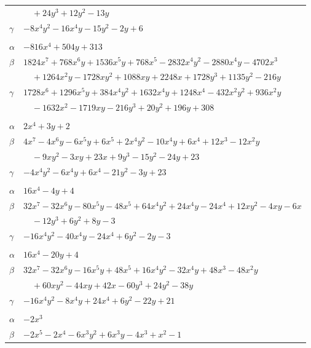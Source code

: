 \documentclass[11pt]{article}
\begin{document}
\begin{longtable}{@{}ll@{}}
 & $\quad +24y^{3}+12y^{2}-13y$\\
$\gamma$ & $-8x^{4}y^{2}-16x^{4}y-15y^{2}-2y+6$\\
\addlinespace[3pt]
\multicolumn{2}{@{}l}{$\{i,j\}=\{1,9\}$, $k_{ij}=5$}\\
$\alpha$ & $-816x^{4}+504y+313$\\
$\beta$ & $1824x^{7}+768x^{6}y+1536x^{5}y+768x^{5}-2832x^{4}y^{2}-2880x^{4}y-4702x^{3}$\\
 & $\quad +1264x^{2}y-1728xy^{2}+1088xy+2248x+1728y^{3}+1135y^{2}-216y$\\
$\gamma$ & $1728x^{6}+1296x^{5}y+384x^{4}y^{2}+1632x^{4}y+1248x^{4}-432x^{2}y^{2}+936x^{2}y$\\
 & $\quad -1632x^{2}-1719xy-216y^{3}+20y^{2}+196y+308$\\
\addlinespace[3pt]
\multicolumn{2}{@{}l}{$\{i,j\}=\{1,10\}$, $k_{ij}=5^{2}$}\\
$\alpha$ & $2x^{4}+3y+2$\\
$\beta$ & $4x^{7}-4x^{6}y-6x^{5}y+6x^{5}+2x^{4}y^{2}-10x^{4}y+6x^{4}+12x^{3}-12x^{2}y$\\
 & $\quad -9xy^{2}-3xy+23x+9y^{3}-15y^{2}-24y+23$\\
$\gamma$ & $-4x^{4}y^{2}-6x^{4}y+6x^{4}-21y^{2}-3y+23$\\
\addlinespace[3pt]
\multicolumn{2}{@{}l}{$\{i,j\}=\{1,11\}$, $k_{ij}=1$}\\
$\alpha$ & $16x^{4}-4y+4$\\
$\beta$ & $32x^{7}-32x^{6}y-80x^{5}y-48x^{5}+64x^{4}y^{2}+24x^{4}y-24x^{4}+12xy^{2}-4xy-6x$\\
 & $\quad -12y^{3}+6y^{2}+8y-3$\\
$\gamma$ & $-16x^{4}y^{2}-40x^{4}y-24x^{4}+6y^{2}-2y-3$\\
\addlinespace[3pt]
\multicolumn{2}{@{}l}{$\{i,j\}=\{1,14\}$, $k_{ij}=5^{2}$}\\
$\alpha$ & $16x^{4}-20y+4$\\
$\beta$ & $32x^{7}-32x^{6}y-16x^{5}y+48x^{5}+16x^{4}y^{2}-32x^{4}y+48x^{3}-48x^{2}y$\\
 & $\quad +60xy^{2}-44xy+42x-60y^{3}+24y^{2}-38y$\\
$\gamma$ & $-16x^{4}y^{2}-8x^{4}y+24x^{4}+6y^{2}-22y+21$\\
\addlinespace[3pt]
\multicolumn{2}{@{}l}{$\{i,j\}=\{2,7\}$, $k_{ij}=2$}\\
$\alpha$ & $-2x^{3}$\\
$\beta$ & $-2x^{5}-2x^{4}-6x^{3}y^{2}+6x^{3}y-4x^{3}+x^{2}-1$\\

\end{longtable}
\end{document}
